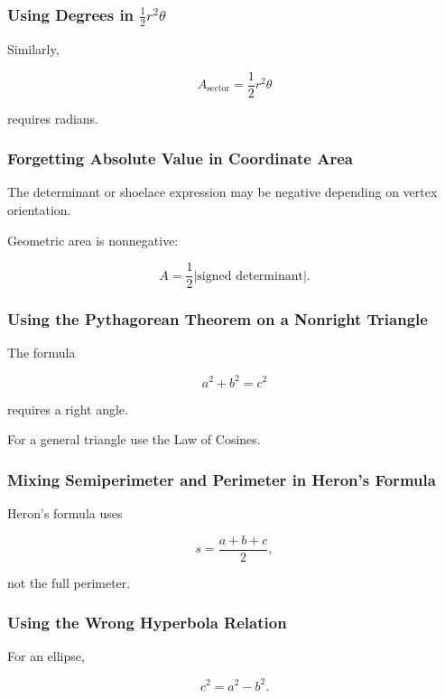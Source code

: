 \subsubsection{Using Degrees in \(\frac12r^2\theta\)}

Similarly,

\[
\boxed{
A_{\mathrm{sector}}
=
\frac12r^2\theta
}
\]

requires radians.

\subsubsection{Forgetting Absolute Value in Coordinate Area}

The determinant or shoelace expression may be negative depending on vertex
orientation.

Geometric area is nonnegative:

\[
\boxed{
A
=
\frac12|\text{signed determinant}|.
}
\]

\subsubsection{Using the Pythagorean Theorem on a Nonright Triangle}

The formula

\[
a^2+b^2=c^2
\]

requires a right angle.

For a general triangle use the Law of Cosines.

\subsubsection{Mixing Semiperimeter and Perimeter in Heron's Formula}

Heron's formula uses

\[
\boxed{
s
=
\frac{a+b+c}{2},
}
\]

not the full perimeter.

\subsubsection{Using the Wrong Hyperbola Relation}

For an ellipse,

\[
\boxed{
c^2=a^2-b^2.
}
\]

